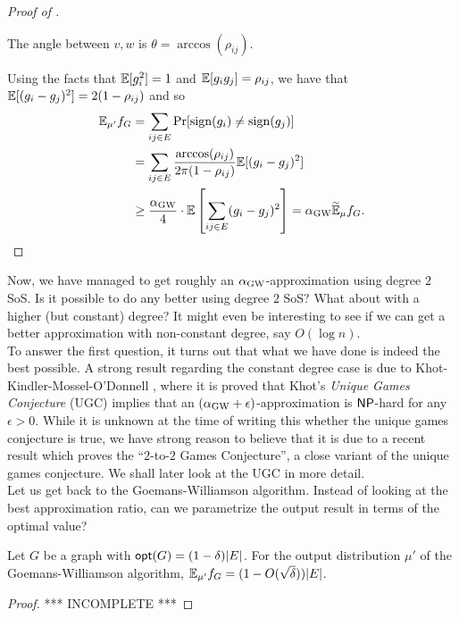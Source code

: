 \begin{proof}[Proof of ]
\begin{center}
		The angle between $v,w$ is $\theta = \arccos(\rho_{ij})$.%
		\end{center}

		Using the facts that $\mathbb{E}[g_i^2] = 1$ and $\mathbb{E}[g_ig_j] = \rho_{ij}$, we have that $\mathbb{E}[(g_i - g_j)^2] = 2(1-\rho_{ij})$ and so
		\begin{align*}
			\mathbb{E}_{\mu'} f_G &= \sum_{ij \in E} \Pr[\operatorname{sign}(g_i) \ne \operatorname{sign}(g_j)] \\
				&= \sum_{ij \in E} \frac{\arccos(\rho_{ij})}{2\pi(1-\rho_{ij})} \mathbb{E}[(g_i - g_j)^2] \\
				&\ge \frac{\alpha_{\text{GW}}}{4} \cdot \mathbb{E}\left[\sum_{ij \in E} (g_i - g_j)^2\right] = \alpha_{\text{GW}} \widetilde{\mathbb{E}}_{\mu} f_G. \qedhere
		\end{align*}
	\end{proof}

	Now, we have managed to get roughly an $\alpha_{\text{GW}}$-approximation using degree $2$ SoS. Is it possible to do any better using degree $2$ SoS? What about with a higher (but constant) degree? It might even be interesting to see if we can get a better approximation with non-constant degree, say $O(\log n)$.\\
	To answer the first question, it turns out that what we have done is indeed the best possible. A strong result regarding the constant degree case is due to Khot-Kindler-Mossel-O'Donnell \cite{max-cut-ugc}, where it is proved that Khot's \emph{Unique Games Conjecture} (UGC) \cite{ugc-og} implies that an $(\alpha_{\text{GW}}+\epsilon)$-approximation is $\mathsf{NP}$-hard for any $\epsilon > 0$. While it is unknown at the time of writing this whether the unique games conjecture is true, we have strong reason to believe that it is due to a recent result \cite{2-2-gc} which proves the ``$2$-to-$2$ Games Conjecture'', a close variant of the unique games conjecture. We shall later look at the UGC in more detail.\\

	Let us get back to the Goemans-Williamson algorithm. Instead of looking at the best approximation ratio, can we parametrize the output result in terms of the optimal value?

	\begin{fprop}
		\label{prop: gw-reparametr}
		Let $G$ be a graph with $\mathsf{opt}(G) = (1-\delta)|E|$. For the output distribution $\mu'$ of the Goemans-Williamson algorithm, $\mathbb{E}_{\mu'} f_G = (1 - O(\sqrt{\delta})) |E|$.
	\end{fprop}
	\begin{proof}
		*** INCOMPLETE ***
	\end{proof}

